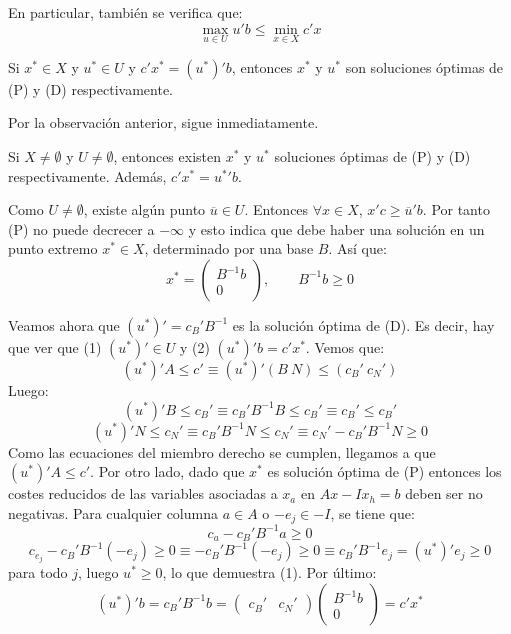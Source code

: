 \documentclass[PM.tex]{subfiles}
\begin{document}
\begin{obser}
En particular, también se verifica que:
\[ \max\limits_{u \in U} u'b ≤ \min\limits_{x\in X} c'x \]
\end{obser}

\begin{coro}
Si $x^* \in X$ y $u^* \in U$ y $c'x^* = (u^*)'b$, entonces $x^*$ y $u^*$ son soluciones óptimas de (P) y (D) respectivamente.
\end{coro}

\begin{dem}
Por la observación anterior, sigue inmediatamente.
\end{dem}

\begin{theorem}
Si $X \neq \emptyset$ y $U \neq \emptyset$, entonces existen $x^*$ y $u^*$ soluciones óptimas de (P) y (D) respectivamente. Además, $c'x^* = {u^*}'b$.
\end{theorem}

\begin{dem}
Como $U \neq \emptyset$, existe algún punto $\overline{u} \in U$. Entonces $\forall x \in X$, $x'c ≥ \overline{u}'b$. Por tanto (P) no puede decrecer a $-\infty$ y esto indica que debe haber una solución en un punto extremo $x^* \in X$, determinado por una base $B$. Así que:
\[ x^* = \begin{pmatrix}B^{-1} b \\ 0\end{pmatrix}, \qquad B^{-1}b ≥ 0 \]

Veamos ahora que $(u^*)' = c_B'B^{-1}$ es la solución óptima de (D). Es decir, hay que ver que (1) $(u^*)' \in U$ y (2) $(u^*)'b = c'x^*$. Vemos que:
\[ (u^*)'A ≤ c' \equiv (u^*)' (B \ N) ≤ (c_B' \ c_N') \]
Luego:
\[ (u^*)'B ≤ c_B' \equiv c_B'B^{-1}B ≤ c_B' \equiv c_B' ≤ c_B'\]
\[ (u^*)'N ≤ c_N' \equiv c_B'B^{-1}N ≤ c_N' \equiv c_N' - c_B'B^{-1}N ≥ 0\]
Como las ecuaciones del miembro derecho se cumplen, llegamos a que $(u^*)'A ≤ c'$. Por otro lado, dado que $x^*$ es solución óptima de (P) entonces los costes reducidos de las variables asociadas a $x_a$ en $Ax - I x_h = b$ deben ser no negativas. Para cualquier columna $a \in A$ o $-e_j \in -I$, se tiene que:
\[ c_a - c_B' B^{-1} a ≥ 0 \]
\[ c_{e_j} - c_B' B^{-1}(-e_j) ≥ 0 \equiv  -c_B'B^{-1}(-e_j) ≥ 0 \equiv c_B'B^{-1}e_j = (u^*)'e_j ≥ 0 \]
para todo $j$, luego $u^* ≥ 0$, lo que demuestra (1). Por último:
\[ (u^*)'b = c_B'B^{-1}b = \begin{pmatrix}c_B' & c_N'\end{pmatrix}\begin{pmatrix}B^{-1}b\\0\end{pmatrix} = c'x^* \]
\end{dem}
\end{document}
